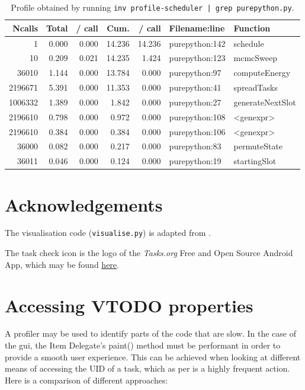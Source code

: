 \documentclass{prettytex/ox/mmsc-special-topic}
\begin{document}
  \begin{table}[H]
    \centering
    \caption{Profile obtained by running \texttt{inv profile-scheduler | grep purepython.py}.}
    \begin{tabular}{rrrrrll}
      \hline
      \bf Ncalls & \bf Total & \bf / call & \bf Cum. & \bf / call & \bf Filename:line & \bf Function     \\
      \hline
      1          & 0.000     & 0.000      & 14.236   & 14.236     & purepython:142    & schedule         \\
      10         & 0.209     & 0.021      & 14.235   & 1.424      & purepython:123    & mcmcSweep        \\
      36010      & 1.144     & 0.000      & 13.784   & 0.000      & purepython:97     & computeEnergy    \\
      2196671    & 5.391     & 0.000      & 11.353   & 0.000      & purepython:41     & spreadTasks      \\
      1006332    & 1.389     & 0.000      & 1.842    & 0.000      & purepython:27     & generateNextSlot \\
      2196610    & 0.798     & 0.000      & 0.972    & 0.000      & purepython:108    & <genexpr>        \\
      2196610    & 0.384     & 0.000      & 0.384    & 0.000      & purepython:106    & <genexpr>        \\
      36000      & 0.082     & 0.000      & 0.217    & 0.000      & purepython:83     & permuteState     \\
      36011      & 0.046     & 0.000      & 0.124    & 0.000      & purepython:19     & startingSlot     \\
    \end{tabular}
  \end{table}

  \section{Acknowledgements}
  The visualisation code (\texttt{visualise.py}) is adapted from \cite{monte-carlo-todo-lists}.

  The task check icon is the logo of the \textit{Tasks.org} Free and Open Source Android App, which may be found \href{https://github.com/tasks/tasks/tree/main/graphics}{here}.

  \pagebreak
  \printbibliography
  \printnoidxglossary[type=acronym]

  \appendix
  \section{Accessing VTODO properties}
  A profiler may be used to identify parts of the code that are slow.
  In the case of the \gls{gui}, the Item Delegate's paint() method must be performant in order to provide a smooth user experience.
  This can be achieved when looking at different means of accessing the UID of a task, which as per  is a highly frequent action.
  Here is a comparison of different approaches:
\end{document}
